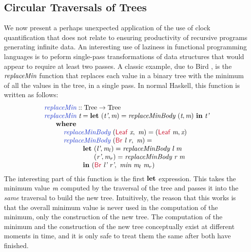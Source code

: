 \subsection{Circular Traversals of Trees}
\label{sec:repmin}

We now present a perhaps unexpected application of the use of clock
quantification that does not relate to ensuring productivity of
recursive programs generating infinite data. An interesting use of
laziness in functional programming languages is to peform single-pass
transformations of data structures that would appear to require at
least two passes. A classic example, due to Bird
\cite{bird84circular}, is the $\textit{replaceMin}$ function that
replaces each value in a binary tree with the minimum of all the
values in the tree, in a single pass. In normal Haskell, this function
is written as follows:
\begin{displaymath}
  \begin{array}{l}
    \defn{replaceMin} :: \tyname{Tree} \to \tyname{Tree} \\
    \defn{replaceMin}\ \ident{t} = \kw{let}\ (\ident{t'}, \ident{m}) = \ident{replaceMinBody}\ (\ident{t}, \ident{m})\ \kw{in}\ \ident{t'} \\
    \hspace{0.6cm} \kw{where} \\
    \hspace{1cm} \defn{replaceMinBody}\ (\cons{Leaf}\ \ident{x},\ \ident{m}) = (\cons{Leaf}\ \ident{m}, \ident{x}) \\
    \hspace{1cm} \defn{replaceMinBody}\ (\cons{Br}\ \ident{l}\ \ident{r},\ \ident{m}) = \\
    \hspace{2cm} \kw{let}\ (\ident{l'}, \ident{m$_l$}) = \ident{replaceMinBody}\ \ident{l}\ \ident{m} \\
    \hspace{2cm} \textcolor{white}{\kw{let}\ }(\ident{r'}, \ident{m$_r$}) = \ident{replaceMinBody}\ \ident{r}\ \ident{m} \\
    \hspace{2cm} \kw{in}\ (\cons{Br}\ \ident{l'}\ \ident{r'},\ \ident{min}\ \ident{m$_l$}\ \ident{m$_r$})
  \end{array}
\end{displaymath}
The interesting part of this function is the first $\textbf{let}$
expression. This takes the minimum value $\textit{m}$ computed by the
traversal of the tree and passes it into the \emph{same} traversal to
build the new tree. Intuitively, the reason that this works is that
the overall minimum value is never used in the computation of the
minimum, only the construction of the new tree. The computation of the
minimum and the construction of the new tree conceptually exist at
different moments in time, and it is only safe to treat them the same
after both have finished.

